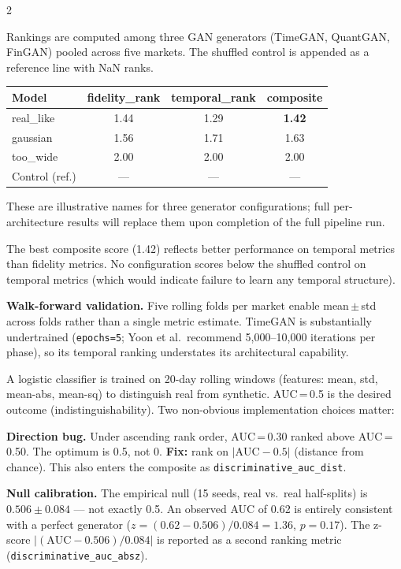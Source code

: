 \documentclass[10pt]{article}
\newcommand{\navybox}[2]{\begin{tcolorbox}[mybox={Navy}{LBg},title={#1}]#2\end{tcolorbox}}
\newcommand{\skybox}[2]{\begin{tcolorbox}[mybox={Sky}{BBg},title={#1}]#2\end{tcolorbox}}
\begin{document}
\begin{multicols}{2}

\navybox{Model Composite Rankings (Table~3)}{%
Rankings are computed among three GAN generators (TimeGAN, QuantGAN, FinGAN) pooled across five markets. The shuffled control is appended as a reference line with NaN ranks.

\smallskip
\begin{tabular}{@{}lccc@{}}
\toprule
Model & fidelity\_rank & temporal\_rank & composite \\
\midrule
real\_like  & 1.44 & 1.29 & \textbf{1.42} \\
gaussian    & 1.56 & 1.71 & 1.63 \\
too\_wide   & 2.00 & 2.00 & 2.00 \\
\midrule
Control (ref.) & --- & --- & --- \\
\bottomrule
\end{tabular}

\smallskip
These are illustrative names for three generator configurations; full per-architecture results will replace them upon completion of the full pipeline run.

The best composite score (1.42) reflects better performance on temporal metrics than fidelity metrics. No configuration scores below the shuffled control on temporal metrics (which would indicate failure to learn any temporal structure).

\textbf{Walk-forward validation.} Five rolling folds per market enable mean\,$\pm$\,std across folds rather than a single metric estimate. TimeGAN is substantially undertrained (\texttt{epochs=5}; Yoon et al.\ recommend 5{,}000--10{,}000 iterations per phase), so its temporal ranking understates its architectural capability.}

\skybox{Discriminative AUC: Null Calibration and Direction Bug}{%
A logistic classifier is trained on 20-day rolling windows (features: mean, std, mean-abs, mean-sq) to distinguish real from synthetic. AUC\,=\,0.5 is the desired outcome (indistinguishability). Two non-obvious implementation choices matter:

\medskip
\textbf{Direction bug.} Under ascending rank order, AUC\,=\,0.30 ranked above AUC\,=\,0.50. The optimum is 0.5, not 0. \textbf{Fix:} rank on $|\text{AUC} - 0.5|$ (distance from chance). This also enters the composite as \texttt{discriminative\_auc\_dist}.

\medskip
\textbf{Null calibration.} The empirical null (15 seeds, real vs.\ real half-splits) is $0.506 \pm 0.084$ --- not exactly 0.5. An observed AUC of 0.62 is entirely consistent with a perfect generator ($z = (0.62 - 0.506)/0.084 = 1.36$, $p = 0.17$). The z-score $|(\text{AUC} - 0.506)/0.084|$ is reported as a second ranking metric (\texttt{discriminative\_auc\_absz}).

}
\end{multicols}
\end{document}
